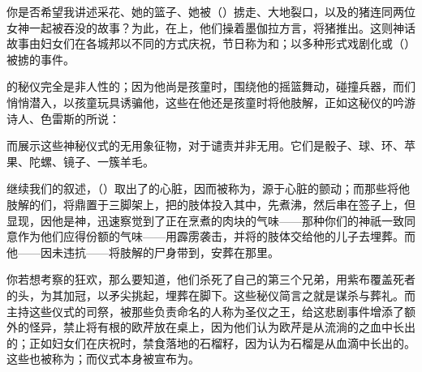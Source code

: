 \par

你是否希望我讲述采花、她的篮子、她被（）掳走、大地裂口，以及的猪连同两位女神一起被吞没的故事？为此，在上，他们操着墨伽拉方言，将猪推出。这则神话故事由妇女们在各城邦以不同的方式庆祝，节日称为和；以多种形式戏剧化或（）被掳的事件。\par

的秘仪完全是非人性的；因为他尚是孩童时，围绕他的摇篮舞动，碰撞兵器，而们悄悄潜入，以孩童玩具诱骗他，这些在他还是孩童时将他肢解，正如这秘仪的吟游诗人、色雷斯的所说：\par

\par

而展示这些神秘仪式的无用象征物，对于谴责并非无用。它们是骰子、球、环、苹果、陀螺、镜子、一簇羊毛。\par

继续我们的叙述，（）取出了的心脏，因而被称为，源于心脏的颤动；而那些将他肢解的们，将鼎置于三脚架上，把的肢体投入其中，先煮沸，然后串在签子上，但显现，因他是神，迅速察觉到了正在烹煮的肉块的气味——那种你们的神祇一致同意作为他们应得份额的气味——用霹雳袭击，并将的肢体交给他的儿子去埋葬。而他——因未违抗——将肢解的尸身带到，安葬在那里。\par

你若想考察的狂欢，那么要知道，他们杀死了自己的第三个兄弟，用紫布覆盖死者的头，为其加冠，以矛尖挑起，埋葬在脚下。这些秘仪简言之就是谋杀与葬礼。而主持这些仪式的司祭，被那些负责命名的人称为圣仪之王，给这悲剧事件增添了额外的怪异，禁止将有根的欧芹放在桌上，因为他们认为欧芹是从流淌的之血中长出的；正如妇女们在庆祝时，禁食落地的石榴籽，因为认为石榴是从血滴中长出的。这些也被称为；而仪式本身被宣布为。\par

